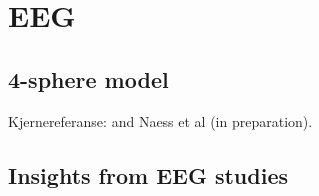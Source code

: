 \section{EEG}
\label{sec:EEG}



\subsection{4-sphere model} 
Kjernereferanse: \citep{Naess2017} and Naess et al (in preparation).


\subsection{Insights from EEG studies} 
